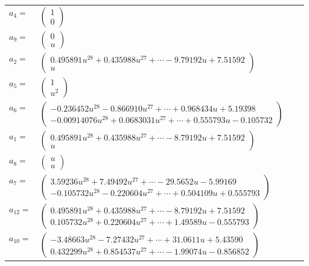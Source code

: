\documentclass[1p]{elsarticle_modified}
\theoremstyle{definition}
\begin{document}
\begin{tabular}{m{7pt} m{180pt} m{7pt} m{180pt} }
\flushright $a_{4}=$&$\begin{pmatrix}1\\0\end{pmatrix}$ \\
\flushright $a_{9}=$&$\begin{pmatrix}0\\u\end{pmatrix}$ \\
\flushright $a_{2}=$&$\begin{pmatrix}0.495891 u^{28}+0.435988 u^{27}+\cdots-9.79192 u+7.51592\\u\end{pmatrix}$ \\
\flushright $a_{5}=$&$\begin{pmatrix}1\\u^2\end{pmatrix}$ \\
\flushright $a_{6}=$&$\begin{pmatrix}-0.236452 u^{28}-0.866910 u^{27}+\cdots+0.968434 u+5.19398\\-0.00914076 u^{28}+0.0683031 u^{27}+\cdots+0.555793 u-0.105732\end{pmatrix}$ \\
\flushright $a_{1}=$&$\begin{pmatrix}0.495891 u^{28}+0.435988 u^{27}+\cdots-8.79192 u+7.51592\\u\end{pmatrix}$ \\
\flushright $a_{8}=$&$\begin{pmatrix}u\\u\end{pmatrix}$ \\
\flushright $a_{7}=$&$\begin{pmatrix}3.59236 u^{28}+7.49492 u^{27}+\cdots-29.5652 u-5.99169\\-0.105732 u^{28}-0.220604 u^{27}+\cdots+0.504109 u+0.555793\end{pmatrix}$ \\
\flushright $a_{12}=$&$\begin{pmatrix}0.495891 u^{28}+0.435988 u^{27}+\cdots-8.79192 u+7.51592\\0.105732 u^{28}+0.220604 u^{27}+\cdots+1.49589 u-0.555793\end{pmatrix}$ \\
\flushright $a_{10}=$&$\begin{pmatrix}-3.48663 u^{28}-7.27432 u^{27}+\cdots+31.0611 u+5.43590\\0.432299 u^{28}+0.854537 u^{27}+\cdots-1.99074 u-0.856852\end{pmatrix}$ \\

\end{tabular}
\end{document}
